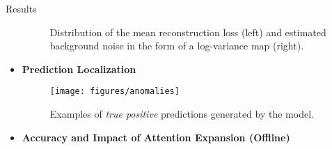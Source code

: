 \documentclass[final,hyperref={pdfpagelabels=false}]{beamer}
\begin{document}
\begin{frame}[t]
\begin{columns}[t]
\begin{column}{.465\textwidth}
\begin{block}{Results}
\begin{itemize}
\begin{figure}
\qquad
{}
\caption{Distribution of the mean reconstruction loss (left) and estimated \\
background noise in the form of a log-variance map (right).}
\end{figure}

%
%
\item\textbf{Prediction Localization}\\[4mm]
\begin{figure}

\texttt{[image: figures/anomalies]}
\caption{Examples of \textit{true positive} predictions generated by the model.\qquad\quad~}
\end{figure}

\item \textbf{Accuracy and Impact of Attention Expansion (Offline)}\\[6mm]


\end{itemize}
\end{block}
\end{column}
\end{columns}
\end{frame}
\end{document}
